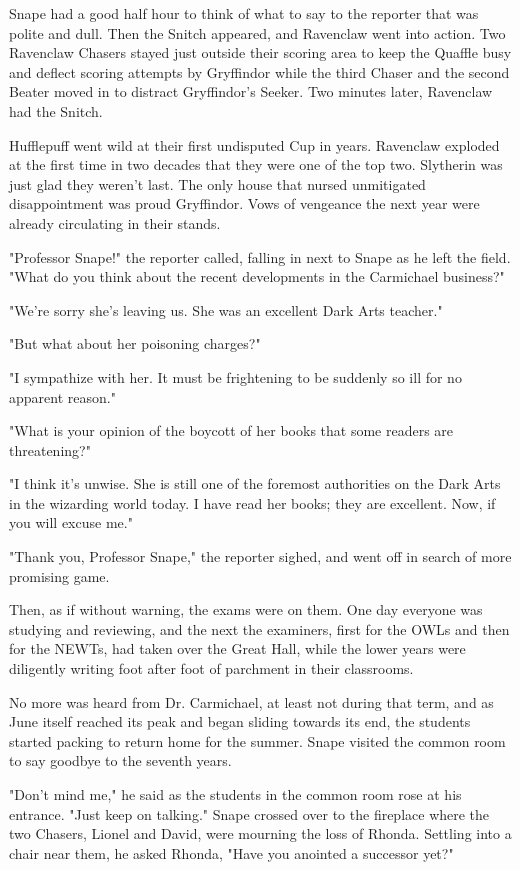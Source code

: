 \documentclass[a4paper,11pt]{article}
\begin{document}
Snape had a good half hour to think of what to say to the reporter that was polite and dull. Then the Snitch appeared, and Ravenclaw went into action. Two Ravenclaw Chasers stayed just outside their scoring area to keep the Quaffle busy and deflect scoring attempts by Gryffindor while the third Chaser and the second Beater moved in to distract Gryffindor's Seeker. Two minutes later, Ravenclaw had the Snitch.

Hufflepuff went wild at their first undisputed Cup in years. Ravenclaw exploded at the first time in two decades that they were one of the top two. Slytherin was just glad they weren't last. The only house that nursed unmitigated disappointment was proud Gryffindor. Vows of vengeance the next year were already circulating in their stands.

"Professor Snape!" the reporter called, falling in next to Snape as he left the field. "What do you think about the recent developments in the Carmichael business?"

"We're sorry she's leaving us. She was an excellent Dark Arts teacher."

"But what about her poisoning charges?"

"I sympathize with her. It must be frightening to be suddenly so ill for no apparent reason."

"What is your opinion of the boycott of her books that some readers are threatening?"

"I think it's unwise. She is still one of the foremost authorities on the Dark Arts in the wizarding world today. I have read her books; they are excellent. Now, if you will excuse me."

"Thank you, Professor Snape," the reporter sighed, and went off in search of more promising game.

Then, as if without warning, the exams were on them. One day everyone was studying and reviewing, and the next the examiners, first for the OWLs and then for the NEWTs, had taken over the Great Hall, while the lower years were diligently writing foot after foot of parchment in their classrooms.

No more was heard from Dr. Carmichael, at least not during that term, and as June itself reached its peak and began sliding towards its end, the students started packing to return home for the summer. Snape visited the common room to say goodbye to the seventh years.

"Don't mind me," he said as the students in the common room rose at his entrance. "Just keep on talking." Snape crossed over to the fireplace where the two Chasers, Lionel and David, were mourning the loss of Rhonda. Settling into a chair near them, he asked Rhonda, "Have you anointed a successor yet?"
\end{document}
